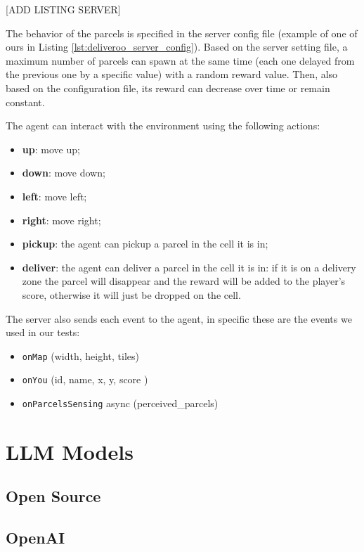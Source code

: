 [ADD LISTING SERVER] \label{lst:deliveroo_server_config}

The behavior of the parcels is specified in the server config file (example of
one of ours in Listing \ref{lst:deliveroo_server_config}). Based on the server
setting file, a maximum number of parcels can spawn at the same time (each one
delayed from the previous one by a specific value) with a random reward value.
Then, also based on the configuration file, its reward can decrease over time or
remain constant.

The agent can interact with the environment using the following actions:
\begin{itemize}
  \item \textbf{up}: move up;

  \item \textbf{down}: move down;

  \item \textbf{left}: move left;

  \item \textbf{right}: move right;

  \item \textbf{pickup}: the agent can pickup a parcel in the cell it is in;

  \item \textbf{deliver}: the agent can deliver a parcel in the cell it is in:
    if it is on a delivery zone the parcel will disappear and the reward will be
    added to the player's score, otherwise it will just be dropped on the cell.
\end{itemize}

The server also sends each event to the agent, in specific these are the events we
used in our tests:
\begin{itemize}
  \item \texttt{onMap} (width, height, tiles)

  \item \texttt{onYou} (id, name, x, y, score )

  \item \texttt{onParcelsSensing} async (perceived\_parcels)
\end{itemize}

\section{LLM Models}
\label{sec:llm_models}

\subsection{Open Source}

\subsection{OpenAI}
